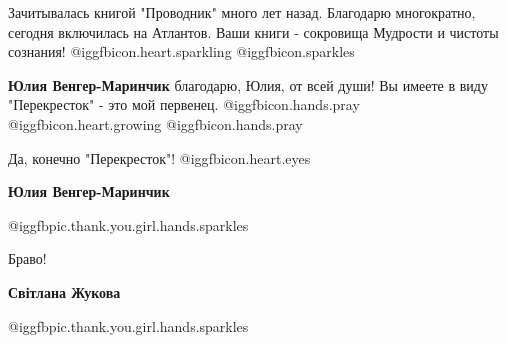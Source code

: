 \begin{itemize}
Зачитывалась книгой "Проводник" много лет назад. Благодарю многократно, сегодня
включилась на Атлантов. Ваши книги - сокровища Мудрости и чистоты сознания! @igg{fbicon.heart.sparkling}  @igg{fbicon.sparkles} 

\begin{itemize}
 
\textbf{Юлия Венгер-Маринчик} благодарю, Юлия, от всей души! Вы имеете в виду
"Перекресток" - это мой первенец. @igg{fbicon.hands.pray}
@igg{fbicon.heart.growing}  @igg{fbicon.hands.pray} 

 
Да, конечно "Перекресток"! @igg{fbicon.heart.eyes} 

 
\textbf{Юлия Венгер-Маринчик}

@igg{fbpic.thank.you.girl.hands.sparkles}
\end{itemize}

 
Браво!

\begin{itemize}
 
\textbf{Світлана Жукова}

@igg{fbpic.thank.you.girl.hands.sparkles}

\end{itemize}

\end{itemize}

